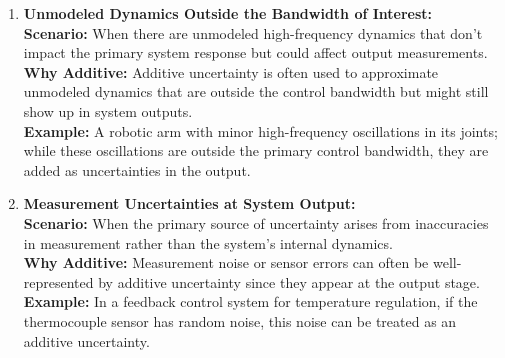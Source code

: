 \begin{enumerate}
    \item \textbf{Unmodeled Dynamics Outside the Bandwidth of Interest:}\\
    \textbf{Scenario:} When there are unmodeled high-frequency dynamics that don’t impact the primary system response but could affect output measurements.\\
\textbf{Why Additive:} Additive uncertainty is often used to approximate unmodeled dynamics that are outside the control bandwidth but might still show up in system outputs.\\
\textbf{Example:} A robotic arm with minor high-frequency oscillations in its joints; while these oscillations are outside the primary control bandwidth, they are added as uncertainties in the output.
    \item \textbf{Measurement Uncertainties at System Output:}\\
   \textbf{ Scenario:} When the primary source of uncertainty arises from inaccuracies in measurement rather than the system's internal dynamics.\\
\textbf{Why Additive:} Measurement noise or sensor errors can often be well-represented by additive uncertainty since they appear at the output stage.\\
\textbf{Example:} In a feedback control system for temperature regulation, if the thermocouple sensor has random noise, this noise can be treated as an additive uncertainty.
\end{enumerate}


